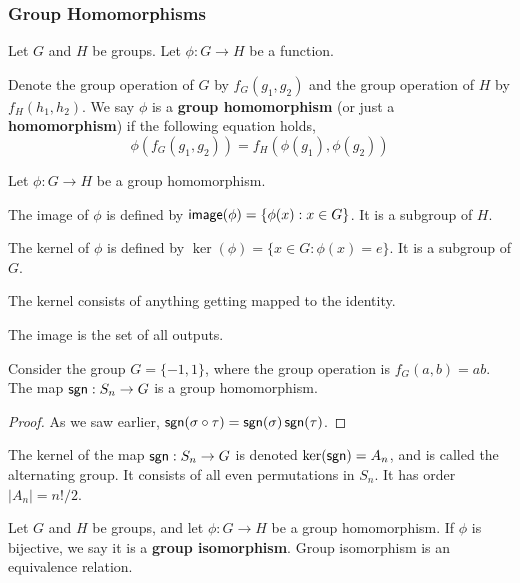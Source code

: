 \subsubsection{Group Homomorphisms}

\begin{defn}
Let $G$ and $H$ be groups. Let $\phi : G \to H$ be a function.

Denote the group operation of $G$ by $f_G(g_1,g_2)$ and the group operation of $H$ by $f_H(h_1,h_2)$. We say $\phi$ is a \textbf{group homomorphism} (or just a \textbf{homomorphism}) if the following equation holds,
\[\phi(f_G(g_1,g_2)) = f_H(\phi(g_1),\phi(g_2))\]
\end{defn}
\begin{defn}
    Let $\phi : G \to H$ be a group homomorphism.
    
    The image of $\phi$ is defined by $\operatorname{\textsf{image}}(\phi) = \{\phi(x): x\in G\}$. It is a subgroup of $H$.

    The kernel of $\phi$ is defined by $\ker(\phi) = \{x\in G: \phi(x)=e\}$. It is a subgroup of $G$.
\end{defn}
\begin{remark*}
    The kernel consists of anything getting mapped to the identity.

    The image is the set of all outputs.
\end{remark*}
\begin{thm}
    Consider the group $G = \{-1,1\}$, where the group operation is $f_G(a,b) = ab$. The map $\operatorname{\textsf{sgn}} : S_n \to G$ is a group homomorphism.
\end{thm}
\begin{proof}
    As we saw earlier, $\operatorname{\textsf{sgn}}(\sigma\circ\tau) = \operatorname{\textsf{sgn}}(\sigma)\operatorname{\textsf{sgn}}(\tau)$.
\end{proof}
\begin{defn}
    The kernel of the map $\operatorname{\textsf{sgn}} : S_n \to G$ is denoted $\ker (\operatorname{\textsf{sgn}}) = A_n$, and is called the alternating group. It consists of all even permutations in $S_n$. It has order $|A_n| = n!/2$.
\end{defn}


\begin{defn}
Let $G$ and $H$ be groups, and let $\phi : G \to H$ be a group homomorphism. If $\phi$ is bijective, we say it is a \textbf{group isomorphism}. Group isomorphism is an equivalence relation. 
\end{defn}

